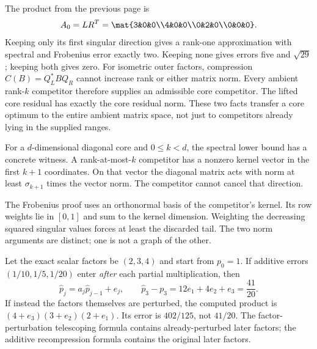 The product from the previous page is
\[
A_0=LR^T=\mat{3&0&0\\4&0&0\\0&2&0\\0&0&0}.
\]
Keeping only its first singular direction gives a rank-one approximation with spectral and Frobenius error exactly two. Keeping none gives errors five and $\sqrt{29}$; keeping both gives zero.
For isometric outer factors, compression $C(B)=Q_L^*BQ_R$ cannot increase rank or either matrix norm. Every ambient rank-$k$ competitor therefore supplies an admissible core competitor. The lifted core residual has exactly the core residual norm. These two facts transfer a core optimum to the entire ambient matrix space, not just to competitors already lying in the supplied ranges.

For a $d$-dimensional diagonal core and $0\le k<d$, the spectral lower bound has a concrete witness. A rank-at-most-$k$ competitor has a nonzero kernel vector in the first $k+1$ coordinates. On that vector the diagonal matrix acts with norm at least $\sigma_{k+1}$ times the vector norm. The competitor cannot cancel that direction.

The Frobenius proof uses an orthonormal basis of the competitor's kernel. Its row weights lie in $[0,1]$ and sum to the kernel dimension. Weighting the decreasing squared singular values forces at least the discarded tail. The two norm arguments are distinct; one is not a graph of the other.

Let the exact scalar factors be $(2,3,4)$ and start from $p_0=1$. If additive errors $(1/10,1/5,1/20)$ enter \emph{after} each partial multiplication, then
\[
\widehat p_j=a_j\widehat p_{j-1}+e_j,\qquad
\widehat p_3-p_3=12e_1+4e_2+e_3=\frac{41}{20}.
\]
If instead the factors themselves are perturbed, the computed product is $(4+e_3)(3+e_2)(2+e_1)$. Its error is $402/125$, not $41/20$. The factor-perturbation telescoping formula contains already-perturbed later factors; the additive recompression formula contains the original later factors.


